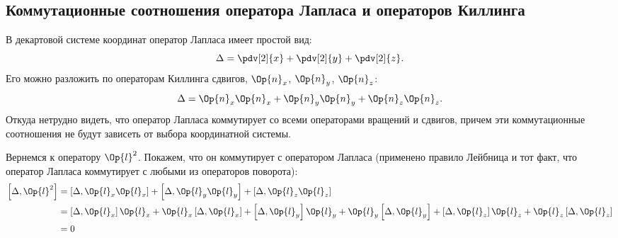%
%
%
%
%
%

\subsection{Коммутационные соотношения оператора Лапласа и операторов Киллинга}

    В декартовой системе координат оператор Лапласа имеет простой вид:
    \begin{equation}
        \Delta = \pdv[2]{x} + \pdv[2]{y} + \pdv[2]{z} .
    \end{equation}
    Его можно разложить по операторам Киллинга сдвигов, $\Op{n}_x$, $\Op{n}_y$, $\Op{n}_z$:
    \begin{equation}
        \Delta = \Op{n}_x\Op{n}_x + \Op{n}_y\Op{n}_y + \Op{n}_z\Op{n}_z .
    \end{equation}
    Откуда нетрудно видеть, что оператор Лапласа коммутирует со всеми операторами вращений и сдвигов, причем эти коммутационные соотношения не будут зависеть от выбора координатной системы.

    Вернемся к оператору $\Op{l}^2$. Покажем, что он коммутирует с оператором Лапласа (применено правило Лейбница и тот факт, что оператор Лапласа коммутирует с любыми из операторов поворота):
    \begin{equation}\begin{aligned}
        \left[ \Delta, \Op{l}^2 \right]
            &= \left[ \Delta, \Op{l}_x \Op{l}_x \right]
                + \left[ \Delta, \Op{l}_y \Op{l}_y \right]
                + \left[ \Delta, \Op{l}_z \Op{l}_z \right] \\
            &= \left[ \Delta, \Op{l}_x \right] \Op{l}_x
                + \Op{l}_x \left[ \Delta, \Op{l}_x \right]
                + \left[ \Delta, \Op{l}_y \right] \Op{l}_y
                + \Op{l}_y \left[ \Delta, \Op{l}_y \right]
                + \left[ \Delta, \Op{l}_z \right] \Op{l}_z
                + \Op{l}_z \left[ \Delta, \Op{l}_z \right] \\
            &= 0
    \end{aligned}\end{equation}

%
%
%
%
%
%

